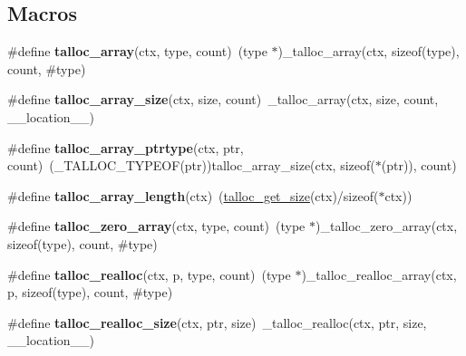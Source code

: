 \subsection*{Macros}
\begin{DoxyCompactItemize}
\item 
\hypertarget{group__talloc__array_ga5c983d8943ef7fcfd5dc6cc6bf171c41}{}\#define {\bfseries talloc\+\_\+array}(ctx,  type,  count)~(type $\ast$)\+\_\+talloc\+\_\+array(ctx, sizeof(type), count, \#type)\label{group__talloc__array_ga5c983d8943ef7fcfd5dc6cc6bf171c41}

\item 
\hypertarget{group__talloc__array_ga37c71e3d64f8a63885d790abcabfb4aa}{}\#define {\bfseries talloc\+\_\+array\+\_\+size}(ctx,  size,  count)~\+\_\+talloc\+\_\+array(ctx, size, count, \+\_\+\+\_\+location\+\_\+\+\_\+)\label{group__talloc__array_ga37c71e3d64f8a63885d790abcabfb4aa}

\item 
\hypertarget{group__talloc__array_gac0da5eb862940491a9a3b5d70fb2f897}{}\#define {\bfseries talloc\+\_\+array\+\_\+ptrtype}(ctx,  ptr,  count)~(\+\_\+\+T\+A\+L\+L\+O\+C\+\_\+\+T\+Y\+P\+E\+O\+F(ptr))talloc\+\_\+array\+\_\+size(ctx, sizeof($\ast$(ptr)), count)\label{group__talloc__array_gac0da5eb862940491a9a3b5d70fb2f897}

\item 
\hypertarget{group__talloc__array_ga7e22e1dbb92741e99e508a785265f5f6}{}\#define {\bfseries talloc\+\_\+array\+\_\+length}(ctx)~(\hyperlink{group__talloc__ref_ga0cbdb71be91a8a1e8f9dc6486beb690f}{talloc\+\_\+get\+\_\+size}(ctx)/sizeof($\ast$ctx))\label{group__talloc__array_ga7e22e1dbb92741e99e508a785265f5f6}

\item 
\hypertarget{group__talloc__array_ga949870bfdff40c923978f2a07885df62}{}\#define {\bfseries talloc\+\_\+zero\+\_\+array}(ctx,  type,  count)~(type $\ast$)\+\_\+talloc\+\_\+zero\+\_\+array(ctx, sizeof(type), count, \#type)\label{group__talloc__array_ga949870bfdff40c923978f2a07885df62}

\item 
\hypertarget{group__talloc__array_ga2b7e4d8578cc005659f87a4f2d385609}{}\#define {\bfseries talloc\+\_\+realloc}(ctx,  p,  type,  count)~(type $\ast$)\+\_\+talloc\+\_\+realloc\+\_\+array(ctx, p, sizeof(type), count, \#type)\label{group__talloc__array_ga2b7e4d8578cc005659f87a4f2d385609}

\item 
\hypertarget{group__talloc__array_gaaf79d75dac6dcbbfa0910069b300f748}{}\#define {\bfseries talloc\+\_\+realloc\+\_\+size}(ctx,  ptr,  size)~\+\_\+talloc\+\_\+realloc(ctx, ptr, size, \+\_\+\+\_\+location\+\_\+\+\_\+)\label{group__talloc__array_gaaf79d75dac6dcbbfa0910069b300f748}

\end{DoxyCompactItemize}
